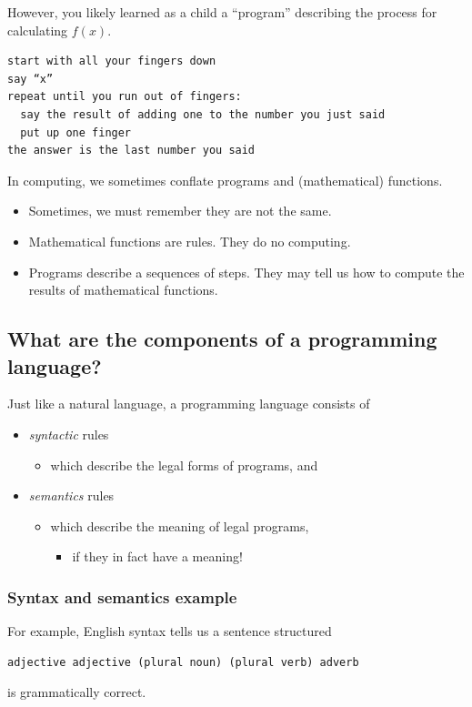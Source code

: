\documentclass[11pt]{article}
\theoremstyle{definition}
\begin{document}
However, you likely learned as a child
a “program” describing the process for calculating \(f(x)\).
\begin{verbatim}
start with all your fingers down
say “x” 
repeat until you run out of fingers:
  say the result of adding one to the number you just said
  put up one finger
the answer is the last number you said
\end{verbatim}

In computing, we sometimes conflate programs and (mathematical) functions.
\begin{itemize}
\item Sometimes, we must remember they are not the same.
\item Mathematical functions are rules. They do no computing.
\item Programs describe a sequences of steps.
They may tell us how to compute
the results of mathematical functions.
\end{itemize}

\subsection{What are the components of a programming language?}
\label{sec:orgc8d6318}

Just like a natural language, a programming language consists of
\begin{itemize}
\item \emph{syntactic} rules
\begin{itemize}
\item which describe the legal forms of programs, and
\end{itemize}
\item \emph{semantics} rules
\begin{itemize}
\item which describe the meaning of legal programs,
\begin{itemize}
\item if they in fact have a meaning!
\end{itemize}
\end{itemize}
\end{itemize}

\subsubsection{Syntax and semantics example}
\label{sec:orge1e9532}

For example, English syntax tells us a sentence structured
\begin{verbatim}
adjective adjective (plural noun) (plural verb) adverb
\end{verbatim}
is grammatically correct.
\end{document}
